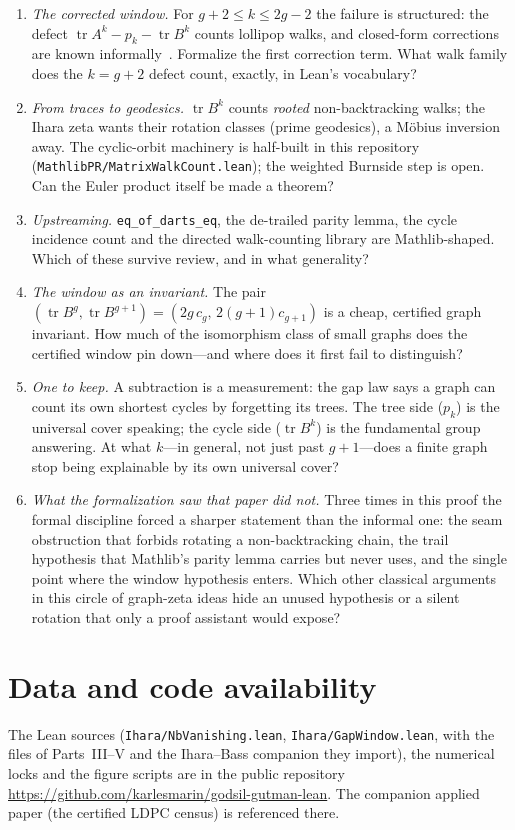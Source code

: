 \documentclass[11pt]{article}
\newcommand{\lean}[1]{\texttt{#1}}
\DeclareMathOperator{\tr}{tr}
\begin{document}
\begin{enumerate}
\item \emph{The corrected window.} For $g+2 \le k \le 2g-2$ the failure is structured: the
defect $\tr A^k - p_k - \tr B^k$ counts lollipop walks, and closed-form corrections are
known informally~\cite{BlakeLin2018,Dehghan2018}. Formalize the first correction term. What
walk family does the $k = g+2$ defect count, exactly, in Lean's vocabulary?
\item \emph{From traces to geodesics.} $\tr B^k$ counts \emph{rooted} non-backtracking
walks; the Ihara zeta wants their rotation classes (prime geodesics), a M\"obius inversion
away. The cyclic-orbit machinery is half-built in this repository
(\lean{MathlibPR/MatrixWalkCount.lean}); the weighted Burnside step is open. Can the Euler
product itself be made a theorem?
\item \emph{Upstreaming.} \lean{eq\_of\_darts\_eq}, the de-trailed parity lemma, the cycle
incidence count and the directed walk-counting library are Mathlib-shaped. Which of these
survive review, and in what generality?
\item \emph{The window as an invariant.} The pair $(\tr B^g, \tr B^{g+1}) = (2g\,c_g,\,
2(g{+}1)c_{g+1})$ is a cheap, certified graph invariant. How much of the isomorphism class
of small graphs does the certified window pin down---and where does it first fail to
distinguish?
\item \emph{One to keep.} A subtraction is a measurement: the gap law says a graph can
count its own shortest cycles by forgetting its trees. The tree side ($p_k$) is the
universal cover speaking; the cycle side ($\tr B^k$) is the fundamental group answering. At
what $k$---in general, not just past $g+1$---does a finite graph stop being explainable by
its own universal cover?
\item \emph{What the formalization saw that paper did not.} Three times in this proof the
formal discipline forced a sharper statement than the informal one: the seam obstruction that
forbids rotating a non-backtracking chain, the trail hypothesis that Mathlib's parity lemma
carries but never uses, and the single point where the window hypothesis enters. Which other
classical arguments in this circle of graph-zeta ideas hide an unused hypothesis or a silent
rotation that only a proof assistant would expose?
\end{enumerate}

\section*{Data and code availability}
The Lean sources (\lean{Ihara/NbVanishing.lean}, \lean{Ihara/GapWindow.lean}, with the
files of Parts~III--V and the Ihara--Bass companion they import), the numerical locks and the figure scripts are in the public
repository \url{https://github.com/karlesmarin/godsil-gutman-lean}. The companion applied
paper (the certified LDPC census) is referenced there.
\end{document}
